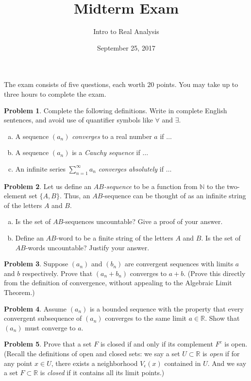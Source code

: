 \documentclass{amsart}
\newcommand{\+}[1]{\ensuremath{\mathbf{#1}}}
\newcommand{\R}{{\mathbb R}}
\theoremstyle{definition}
\newtheorem{prob}{Problem}
\begin{document}
\title{Midterm Exam}
\date{September 25, 2017}
\author{Intro to Real Analysis}

\maketitle


The exam consists of five questions, each worth $20$ points.
You may take up to three hours to complete the exam.

\vspace{3mm}

\begin{prob}
Complete the following definitions.  Write in complete English sentences, 
and avoid use of quantifier symbols like $\forall$ and $\exists$.
\begin{enumerate}[(a)]
 \item A sequence $(a_n)$ \emph{converges} to a real number $a$ if $\ldots$  
 \item A sequence $(a_n)$ is a \emph{Cauchy sequence} if $\ldots$
 \item An infinite series $\sum^{\infty}_{n=1}a_n$ \emph{converges absolutely} if $\ldots$
\end{enumerate}
\end{prob}

\begin{prob}
Let us define an \emph{$AB$-sequence} to be a function from $\mathbb{N}$ to the two-element set $\{A,B\}$.
Thus, an $AB$-sequence can be thought of as an infinite string of the letters $A$ and $B$.
\begin{enumerate}[(a)]
 \item Is the set of $AB$-sequences uncountable? Give a proof of your answer.
 \item Define an $AB$-word to be a finite string of the letters $A$ and $B$.  Is the set of $AB$-words
 uncountable? Justify your answer.
\end{enumerate}
\end{prob}

\begin{prob}
 Suppose $(a_n)$ and $(b_n)$ are convergent sequences with limits $a$ and $b$ respectively.
 Prove that $(a_n+b_n)$ converges to $a+b$.  (Prove this directly from the definition of convergence,
 without appealing to the Algebraic Limit Theorem.)
\end{prob}

\begin{prob}
 Assume $(a_n)$ is a bounded sequence with the property that
 every convergent subsequence of $(a_n)$ converges to the same limit
 $a \in \R$.  Show that $(a_n)$ must converge to $a$.
\end{prob}



\begin{prob}
Prove that a set $F$ is closed if and only if its complement $F^c$ is open.
(Recall the definitions of open and closed sets:
we say a set $U \subset \R$ is \emph{open} if for any point $x \in U$, there exists a neighborhood
 $V_\epsilon(x)$ contained in $U$.  
And we say a set $F \subset \R$ is \emph{closed} if it contains all its limit points.) 
\end{prob}
\end{document}
